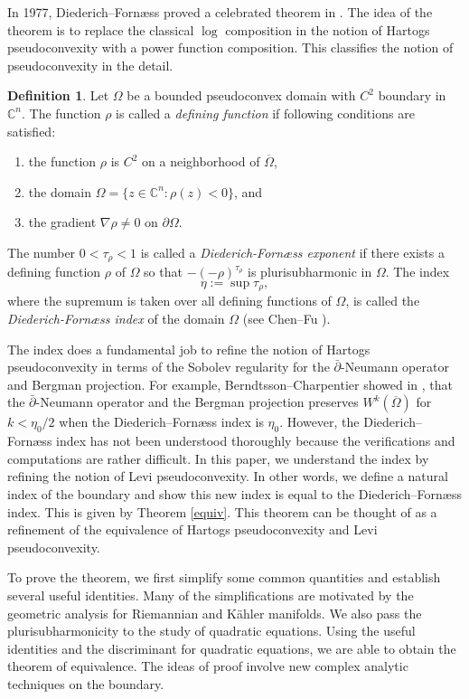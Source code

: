 \documentclass[11pt]{article}
\theoremstyle{plain} \numberwithin{equation}{section}
\theoremstyle{definition}
\newtheorem{definition}[theorem]{Definition}
\begin{document}
In 1977, Diederich--Forn\ae ss proved a celebrated theorem in \citep{DF77b}. The idea of the theorem is to replace the classical $\log$ composition in the notion of Hartogs pseudoconvexity with a power function composition. This classifies the notion of pseudoconvexity in the detail.
\begin{definition}\label{df}
	Let $\Omega$ be a bounded pseudoconvex domain with $C^2$ boundary in $\mathbb{C}^n$. The function $\rho$ is called a \textit{defining function} if following conditions are satisfied:
	\begin{enumerate}
		\item the function $\rho$ is $C^2$ on a neighborhood of $\overline{\Omega}$,
		\item the domain $\Omega=\lbrace z\in\mathbb{C}^n: \rho(z)<0 \rbrace$, and 
		\item the gradient $\nabla\rho\neq 0$ on $\partial\Omega$.
	\end{enumerate}
	The number 
	$0 < \tau_\rho < 1$ is called a \textit{Diederich-Forn\ae ss exponent} if there exists a defining 
	function $\rho$ of $\Omega$ so that $-(-\rho)^{\tau_\rho}$ is plurisubharmonic in $\Omega$. 
	The index 
	\[\eta:=\sup \tau_\rho ,\] 
	where the supremum is taken over all defining functions of $\Omega$, is 
	called the \textit{Diederich-Forn\ae ss index} of the domain $\Omega$ (see Chen--Fu \citep{CF11}). 
\end{definition}

The index does a fundamental job to refine the notion of Hartogs pseudoconvexity in terms of the Sobolev regularity for the $\bar{\partial}$-Neumann operator and Bergman projection. For example, Berndtsson--Charpentier showed in \citep{BC00}, that the $\bar{\partial}$-Neumann operator and the Bergman projection preserves $W^k(\overline{\Omega})$ for $k<\eta_0/2$ when the Diederich--Forn\ae ss index is $\eta_0$. However, the Diederich--Forn\ae ss index has not been understood thoroughly because the verifications and computations are rather difficult. In this paper, we understand the index by refining the notion of Levi pseudoconvexity. In other words, we define a natural index of the boundary and show this new index is equal to the Diederich--Forn\ae ss index. This is given by Theorem \ref{equiv}. This theorem can be thought of as a refinement of the equivalence of Hartogs pseudoconvexity and Levi pseudoconvexity. 

To prove the theorem, we first simplify some common quantities and establish several useful identities. Many of the simplifications are motivated by the geometric analysis for Riemannian and K\"{a}hler manifolds. We also pass the plurisubharmonicity to the study of quadratic equations. Using the useful identities and the discriminant for quadratic equations, we are able to obtain the theorem of equivalence. The ideas of proof involve new complex analytic techniques on the boundary.
\end{document}
